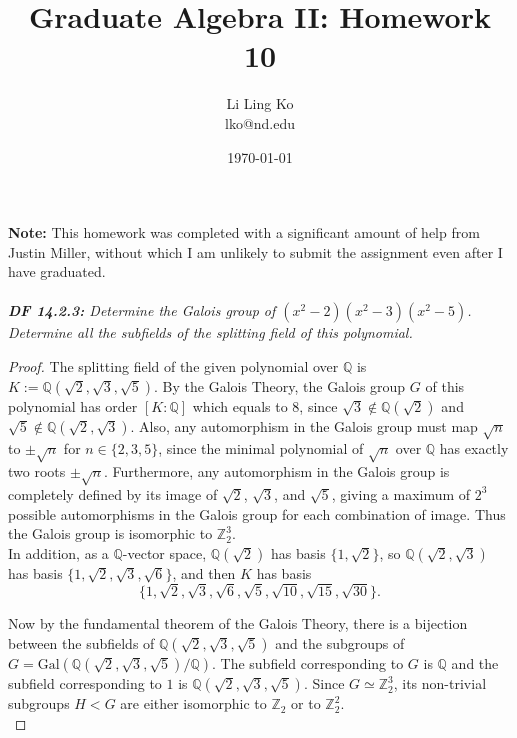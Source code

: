 \documentclass{article}
\begin{document}
\title{Graduate Algebra II: Homework 10}
\author{Li Ling Ko\\ lko@nd.edu}
\date{\today}
\maketitle

\textbf{Note:} This homework was completed with a significant amount of
  help from Justin Miller, without which I am unlikely to submit the
  assignment even after I have graduated. \\\\

\it \textbf{DF 14.2.3:} Determine the Galois group of
  $(x^2-2)(x^2-3)(x^2-5)$. Determine all the subfields of the splitting
  field of this polynomial.

  \begin{proof}
    The splitting field of the given polynomial over $\mathbb{Q}$ is
    $K:=\mathbb{Q}(\sqrt{2},\sqrt{3},\sqrt{5})$. By the Galois Theory, the
    Galois group $G$ of this polynomial has order
    $[K:\mathbb{Q}]$ which equals to
    8, since $\sqrt{3}\not\in\mathbb{Q}(\sqrt{2})$ and
    $\sqrt{5}\not\in\mathbb{Q}(\sqrt{2},\sqrt{3})$. Also, any automorphism
    in the Galois group must map $\sqrt{n}$ to $\pm\sqrt{n}$ for
    $n\in\{2,3,5\}$, since the minimal polynomial of $\sqrt{n}$ over
    $\mathbb{Q}$ has exactly two roots $\pm\sqrt{n}$. Furthermore, any
    automorphism in the Galois group is completely defined by its image of
    $\sqrt{2}$, $\sqrt{3}$, and $\sqrt{5}$, giving a maximum of $2^3$
    possible automorphisms in the Galois group for each combination of
    image. Thus the Galois group is isomorphic to $\mathbb{Z}_2^3$. \\

    In addition, as a $\mathbb{Q}$-vector space,
    $\mathbb{Q}(\sqrt{2})$ has basis $\{1,\sqrt{2}\}$, so
    $\mathbb{Q}(\sqrt{2},\sqrt{3})$ has basis
    $\{1,\sqrt{2},\sqrt{3},\sqrt{6}\}$, and then $K$ has basis
    \[\{1,\sqrt{2},\sqrt{3},\sqrt{6},
    \sqrt{5},\sqrt{10},\sqrt{15},\sqrt{30}\}.\]

    Now by the fundamental theorem of the Galois Theory, there is a bijection
    between the subfields of $\mathbb{Q}(\sqrt{2},\sqrt{3},\sqrt{5})$ and
    the subgroups of $G= \text{Gal}(\mathbb{Q}(\sqrt{2},\sqrt{3},\sqrt{5})
    /\mathbb{Q})$. The subfield corresponding to $G$ is $\mathbb{Q}$ and
    the subfield corresponding to $1$ is
    $\mathbb{Q}(\sqrt{2},\sqrt{3},\sqrt{5})$. Since
    $G\simeq\mathbb{Z}_2^3$, its non-trivial subgroups $H<G$ are either
    isomorphic to $\mathbb{Z}_2$ or to $\mathbb{Z}_2^2$. \\


\end{proof}
\end{document}
